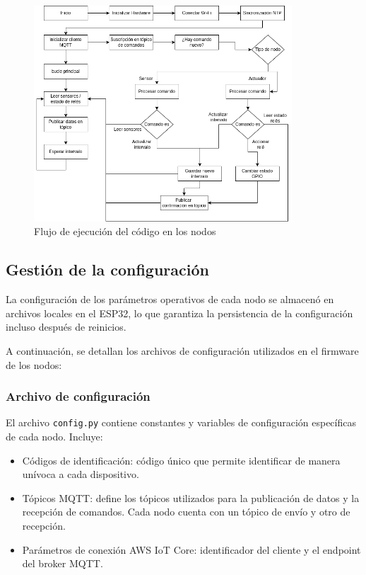 \begin{figure}[H]
    \centering
    \includegraphics[width=0.86\textwidth]{./Images/30_flujo_ppal_nodos.png}
    \caption{Flujo de ejecución del código en los nodos}
    \label{fig:flujo_nodos}
\end{figure}


\subsection{Gestión de la configuración}

La configuración de los parámetros operativos de cada nodo se almacenó en
archivos locales en el ESP32, lo que garantiza la persistencia de la
configuración incluso después de reinicios.

A continuación, se detallan los archivos de configuración utilizados en el
firmware de los nodos:

\subsubsection{Archivo de configuración}

El archivo \texttt{config.py} contiene constantes y variables de configuración
específicas de cada nodo. Incluye:
\begin{itemize}
    \item Códigos de identificación: código único que permite identificar de manera
          unívoca a cada dispositivo.
    \item Tópicos MQTT: define los tópicos utilizados para la publicación de datos y la
          recepción de comandos. Cada nodo cuenta con un tópico de envío y otro de
          recepción.
    \item Parámetros de conexión AWS IoT Core: identificador del cliente y el endpoint
          del broker MQTT.
\end{itemize}

